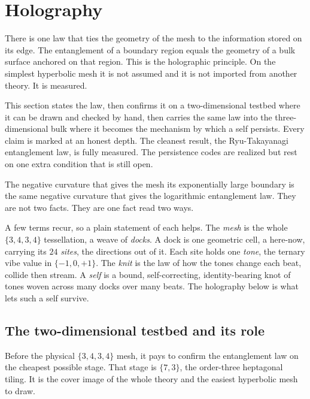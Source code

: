 \section{Holography}

There is one law that ties the geometry of the mesh to the information stored on its edge. The entanglement of a boundary region equals the geometry of a bulk surface anchored on that region. This is the holographic principle. On the simplest hyperbolic mesh it is not assumed and it is not imported from another theory. It is measured.

This section states the law, then confirms it on a two-dimensional testbed where it can be drawn and checked by hand, then carries the same law into the three-dimensional bulk where it becomes the mechanism by which a self persists. Every claim is marked at an honest depth. The cleanest result, the Ryu-Takayanagi entanglement law, is fully measured. The persistence codes are realized but rest on one extra condition that is still open.

\begin{principle}
The negative curvature that gives the mesh its exponentially large boundary is the same negative curvature that gives the logarithmic entanglement law. They are not two facts. They are one fact read two ways.
\end{principle}

A few terms recur, so a plain statement of each helps. The \emph{mesh} is the whole $\{3,4,3,4\}$ tessellation, a weave of \emph{docks}. A dock is one geometric cell, a here-now, carrying its $24$ \emph{sites}, the directions out of it. Each site holds one \emph{tone}, the ternary vibe value in $\{-1,0,+1\}$. The \emph{knit} is the law of how the tones change each beat, collide then stream. A \emph{self} is a bound, self-correcting, identity-bearing knot of tones woven across many docks over many beats. The holography below is what lets such a self survive.

\subsection{The two-dimensional testbed and its role}

Before the physical $\{3,4,3,4\}$ mesh, it pays to confirm the entanglement law on the cheapest possible stage. That stage is $\{7,3\}$, the order-three heptagonal tiling. It is the cover image of the whole theory and the easiest hyperbolic mesh to draw.

